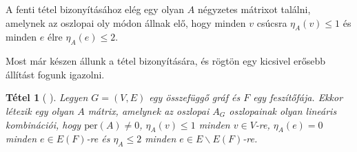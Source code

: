 \documentclass[12pt, a4paper]{report}
\newtheorem{tét}{Tétel}[section]
\theoremstyle{remark}
\theoremstyle{definition}
\begin{document}
A fenti tétel bizonyításához elég egy olyan $A$ négyzetes mátrixot találni, amelynek az oszlopai oly módon állnak elő, hogy minden $v$ csúcsra $\eta_A(v) \leq 1$ és minden $e$ élre $\eta_A(e) \leq 2$.

Most már készen állunk a tétel bizonyítására, és rögtön egy kicsivel erősebb állítást fogunk igazolni. 

\begin{tét} [\citeauthor{Wong2014} \cite{Wong2014}]
Legyen $G = (V, E)$ egy összefüggő gráf és $F$ egy feszítőfája. Ekkor létezik egy olyan $A$ mátrix, amelynek az oszlopai $A_G$ oszlopainak olyan lineáris kombinációi, hogy $\mathrm{per}(A) \neq 0$, $\eta_A(v) \leq 1$ minden $v \in V$-re, $\eta_A(e) = 0$ minden $e \in E(F)$-re és $\eta_A \leq 2$ minden $e \in E \smallsetminus E(F)$-re.
\end{tét}
\end{document}
